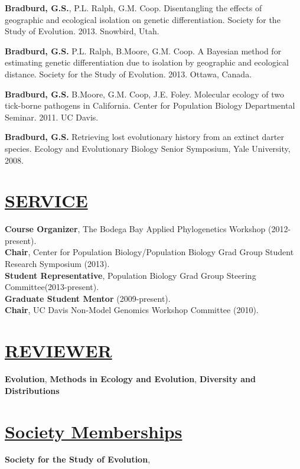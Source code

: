 \documentclass{res}
\begin{document}
\begin{resume}
\textbf{Bradburd, G.S.}, P.L. Ralph, G.M. Coop.   Disentangling the effects of geographic and ecological isolation on genetic differentiation.  Society for the Study of Evolution. 2013. Snowbird, Utah.\

\textbf{Bradburd, G.S.}  P.L. Ralph, B.Moore, G.M. Coop. A Bayesian method for estimating genetic differentiation due to isolation by geographic and ecological distance.  Society for the Study of Evolution. 2013. Ottawa, Canada.\

\textbf{Bradburd, G.S.}  B.Moore, G.M. Coop, J.E. Foley. Molecular ecology of two tick-borne pathogens in California.  Center for Population Biology Departmental Seminar. 2011. UC Davis.\

\textbf{Bradburd, G.S.}  Retrieving lost evolutionary history from an extinct darter species.  Ecology and Evolutionary Biology Senior Symposium, Yale University, 2008.

\section{\underline{SERVICE}}
\textbf{Course Organizer}, The Bodega Bay Applied Phylogenetics Workshop (2012-present).\\
%
\textbf{Chair}, Center for Population Biology/Population Biology Grad Group Student Research Symposium (2013).\\
%
\textbf{Student Representative}, Population Biology Grad Group Steering Committee(2013-present).\\
%
\textbf{Graduate Student Mentor} (2009-present). \\
%
\textbf{Chair}, UC Davis Non-Model Genomics Workshop Committee (2010).
%
\section{\underline{REVIEWER}}
\textbf{Evolution}, 
\textbf{Methods in Ecology and Evolution}, 
\textbf{Diversity and Distributions}

\section{\underline{Society Memberships}}
\textbf{Society for the Study of Evolution},


\end{resume}
\end{document}
